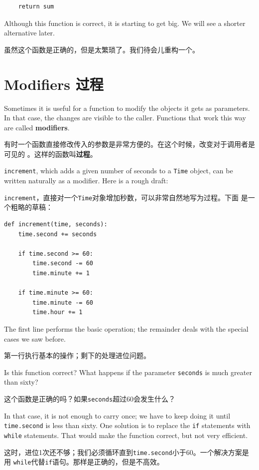 \documentclass[10pt]{book}
\begin{document}
\begin{CJK}{UTF8}{gbsn}
\begin{verbatim}
    return sum
\end{verbatim}
%
Although this function is correct, it is starting to get big.
We will see a shorter alternative later.

虽然这个函数是正确的，但是太繁琐了。我们待会儿重构一个。


\section{Modifiers 过程}
\label{increment}

Sometimes it is useful for a function to modify the objects it gets as
parameters.  In that case, the changes are visible to the caller.
Functions that work this way are called {\bf modifiers}.

有时一个函数直接修改传入的参数是非常方便的。在这个时候，改变对于调用者是可见的
。这样的函数叫{\bf 过程}。

{\tt increment}, which adds a given number of seconds to a {\tt Time}
object, can be written naturally as a
modifier.  Here is a rough draft:

{\tt increment}，直接对一个{\tt Time}对象增加秒数，可以非常自然地写为过程。下面
是一个粗略的草稿：

\begin{verbatim}
def increment(time, seconds):
    time.second += seconds

    if time.second >= 60:
        time.second -= 60
        time.minute += 1

    if time.minute >= 60:
        time.minute -= 60
        time.hour += 1
\end{verbatim}
%
The first line performs the basic operation; the remainder deals
with the special cases we saw before.

第一行执行基本的操作；剩下的处理进位问题。

Is this function correct?  What happens if the parameter {\tt seconds}
is much greater than sixty?  

这个函数是正确的吗？如果{\tt seconds}超过60会发生什么？

In that case, it is not enough to carry
once; we have to keep doing it until {\tt time.second} is less than sixty.
One solution is to replace the {\tt if} statements with {\tt while}
statements.  That would make the function correct, but not
very efficient.

这时，进位1次还不够；我们必须循环直到{\tt time.second}小于60。一个解决方案是用
{\tt while}代替{\tt if}语句。那样是正确的，但是不高效。


\end{CJK}
\end{document}
